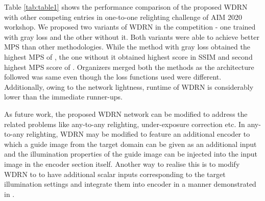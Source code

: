 \documentclass[runningheads]{llncs}
\begin{document}
\begin{table}[h!]
\centering
\caption{Performance comparison of WDRN with competing entries in scene relighting and illumination estimation challenge, track-1 one-to-one relighting at AIM 2020 workshop. The MPS, used to determine the final ranking, is computed following Eq.~\eqref{eq:MPS}.}
\label{tab:table1}
\end{table}

\par
Table \ref{tab:table1} shows the performance comparison of the proposed WDRN with other competing entries in one-to-one relighting challenge of AIM 2020 workshop. We proposed two variants of WDRN in the competition - one trained with gray loss and the other without it. Both variants were able to achieve better MPS than other methodologies. While the method with gray loss obtained the highest MPS of , the one without it obtained highest score in SSIM and  second highest MPS score of . Organizers merged both the methods as the architecture followed was same even though the loss functions used were different. Additionally, owing to the network lightness, runtime of WDRN is considerably lower than the immediate runner-ups. 

\par
As future work, the proposed WDRN network can be modified to address the related problems like any-to-any relighting, under-exposure correction etc. In any-to-any relighting, WDRN may be modified to feature an additional encoder to which a guide image from the target domain can be given as an additional input and the illumination properties of the guide image can be injected into the input image in the encoder section itself. Another way to realise this is to modify WDRN to to have additional scalar inputs corresponding to the target illumination settings and integrate them into encoder in a manner demonstrated in \cite{relightnet_a}.
\end{document}
